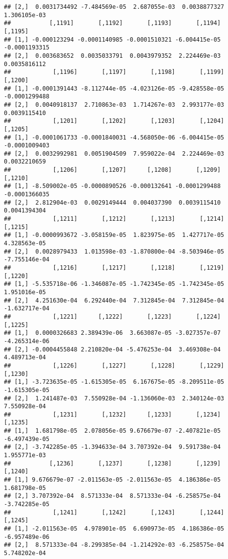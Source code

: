 \documentclass[
]{article}
\begin{document}
\begin{verbatim}
## [2,]  0.0031734492 -7.484569e-05  2.687055e-03  0.0038877327  1.306105e-03
##           [,1191]       [,1192]       [,1193]       [,1194]       [,1195]
## [1,] -0.000123294 -0.0001140985 -0.0001510321 -6.004415e-05 -0.0001193315
## [2,]  0.003683652  0.0035033791  0.0043979352  2.224469e-03  0.0035816112
##            [,1196]       [,1197]       [,1198]       [,1199]       [,1200]
## [1,] -0.0001391443 -8.112744e-05 -4.023126e-05 -9.428558e-05 -0.0001299488
## [2,]  0.0040918137  2.710863e-03  1.714267e-03  2.993177e-03  0.0039115410
##            [,1201]       [,1202]       [,1203]       [,1204]       [,1205]
## [1,] -0.0001061733 -0.0001840031 -4.568050e-06 -6.004415e-05 -0.0001009403
## [2,]  0.0032992981  0.0051904509  7.959022e-04  2.224469e-03  0.0032210659
##            [,1206]       [,1207]      [,1208]       [,1209]       [,1210]
## [1,] -8.509002e-05 -0.0000890526 -0.000132641 -0.0001299488 -0.0001366035
## [2,]  2.812904e-03  0.0029149444  0.004037390  0.0039115410  0.0041394304
##            [,1211]       [,1212]       [,1213]       [,1214]       [,1215]
## [1,] -0.0000993672 -3.058159e-05  1.823975e-05  1.427717e-05  4.328563e-05
## [2,]  0.0028979433  1.013598e-03 -1.870800e-04 -8.503946e-05 -7.755146e-04
##            [,1216]       [,1217]       [,1218]       [,1219]       [,1220]
## [1,] -5.535718e-06 -1.346087e-05 -1.742345e-05 -1.742345e-05  1.951016e-05
## [2,]  4.251630e-04  6.292440e-04  7.312845e-04  7.312845e-04 -1.632717e-04
##            [,1221]      [,1222]       [,1223]       [,1224]       [,1225]
## [1,]  0.0000326683 2.389439e-06  3.663087e-05 -3.027357e-07 -4.265314e-06
## [2,] -0.0004455848 2.210820e-04 -5.476253e-04  3.469308e-04  4.489713e-04
##            [,1226]       [,1227]       [,1228]       [,1229]       [,1230]
## [1,] -3.723635e-05 -1.615305e-05  6.167675e-05 -8.209511e-05 -1.615305e-05
## [2,]  1.241487e-03  7.550928e-04 -1.136060e-03  2.340124e-03  7.550928e-04
##            [,1231]       [,1232]      [,1233]       [,1234]       [,1235]
## [1,]  1.681798e-05  2.078056e-05 9.676679e-07 -2.407821e-05 -6.497439e-05
## [2,] -3.742285e-05 -1.394633e-04 3.707392e-04  9.591738e-04  1.955771e-03
##           [,1236]       [,1237]       [,1238]       [,1239]       [,1240]
## [1,] 9.676679e-07 -2.011563e-05 -2.011563e-05  4.186386e-05  1.681798e-05
## [2,] 3.707392e-04  8.571333e-04  8.571333e-04 -6.258575e-04 -3.742285e-05
##            [,1241]       [,1242]       [,1243]       [,1244]       [,1245]
## [1,] -2.011563e-05  4.978901e-05  6.690973e-05  4.186386e-05 -6.957489e-06
## [2,]  8.571333e-04 -8.299385e-04 -1.214292e-03 -6.258575e-04  5.748202e-04

\end{verbatim}
\end{document}
